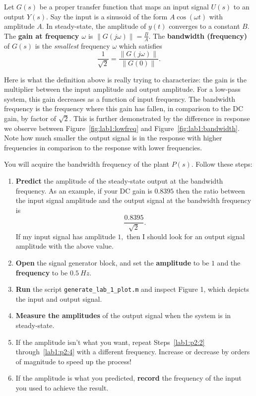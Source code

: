 %
\begin{definition}[Bandwidth]
  Let \(G(s)\) be a proper transfer function
  that maps an input signal \(U(s)\) to an output \(Y(s).\)
%
  Say the input is a sinusoid of the form \(A \cos(\omega t)\) with amplitude
  \(A.\) In steady-state, the amplitude of \(y(t)\) converges to a constant
  \(B.\) The \textbf{gain at frequency \(\omega\)} is
  \(\left\|G(j\omega)\right\| = \frac{B}{A}.\)
%
  The \textbf{bandwidth (frequency)} of \(G(s)\) is the \emph{smallest}
  frequency \(\omega\) which satisfies
  \[
    \frac{1}{\sqrt{2}} = \frac{\left\|G(j\omega)\right\|}{\left\|G(0)\right\|}.
  \]
\end{definition}
%
Here is what the definition above is really trying to characterize: the
gain is the multiplier between the input amplitude and output amplitude. For
a low-pass system, this gain decreases as a function of input frequency. The
bandwidth frequency is the frequency where this gain has fallen, in comparison
to the DC gain, by factor of \(\sqrt{2}.\) This is further demonstrated
by the difference in response we observe between Figure~\ref{fig:lab1:lowfreq}
and Figure~\ref{fig:lab1:bandwidth}. Note how much smaller the output signal
is in the response with higher frequencies in comparison to the response
with lower frequencies.
%
\begin{procedure}
  You will acquire the bandwidth frequency of the plant \(P(s)\).
  Follow these steps:
  \begin{enumerate}[label=(\arabic*)]
    \item{
      \textbf{Predict} the amplitude of the steady-state output at the
      bandwidth frequency. As an example, if your DC gain is \(0.8395\) then
      the ratio between the input signal amplitude and the output signal
      at the bandwidth frequency is
      \[
        \frac{0.8395}{\sqrt{2}}.
      \]
      If my input signal has amplitude \(1,\) then I should look for
      an output signal amplitude with the above value.
    }
    \item{
      \textbf{Open} the signal generator block, and set the
      \textbf{amplitude} to be \(1\) and
      the \textbf{frequency} to be \(\SI{0.5}{Hz}.\)
      \label{lab1:p2:2}
    }
    \item{
      \textbf{Run} the script \texttt{generate\_lab\_1\_plot.m} and inspect
      Figure 1, which depicts the input and output signal.
    }
    \item{
      \textbf{Measure the amplitudes} of the output signal
      when the system is in steady-state.
      \label{lab1:p2:4}
    }
    \item{
      If the amplitude isn't what you want, repeat Steps~\ref{lab1:p2:2} through~\ref{lab1:p2:4} with a different frequency. Increase or decrease
      by orders of magnitude to speed up the process!
    }
    \item{
      If the amplitude is what you predicted, \textbf{record} the frequency
      of the input you used to achieve the result.
    }
  \end{enumerate}
  \label{lab1:p2}
\end{procedure}
